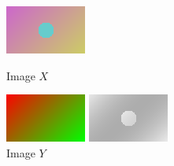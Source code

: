\documentclass[12pt]{article}
\begin{document}
\begin{figure}
  \begin{minipage}[b]{0.40\linewidth}
    \centering
    \includegraphics[width=\textwidth]{./dataAfter.png}
    \caption{Image $X$}
  \end{minipage}
  \hfill
  \begin{minipage}[b]{0.40\linewidth}
    \centering
    \includegraphics[width=\textwidth]{./dataBefore.png}
    \caption{Image $Y$}
  \end{minipage}
  \vfill
  \begin{minipage}[b]{0.40\linewidth}
    \centering
    \includegraphics[width=\textwidth]{./naivediff.png}

\end{minipage}
\end{figure}
\end{document}
